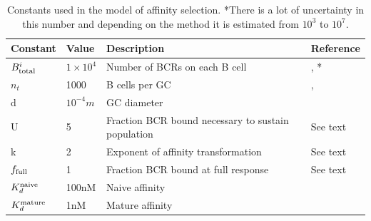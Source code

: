 

\begin{table}[ht]
\centering
\begin{tabular}{llll}
Constant    & Value & Description & Reference \\ \hline
$B^i_{\text{total}}$ & $1\times10^{4}$     & Number of BCRs on each B cell & \cite{immprot}, \cite{rieckmann2017social}*     \\
$n_t$ & 1000 & B cells per GC &  \cite{kroese1990germinal}, \cite{Childs_Baskerville_Cobey_2015} \\
d & $10^{-4} m$ & GC diameter &  \cite{Romppanen_1981} \\
U           & 5     & Fraction BCR bound necessary to sustain population & See text \\
k           & 2     & Exponent of affinity transformation & See text  \\
$f_{\text{full}}$  & 1     & Fraction BCR bound at full response & See text \\
$K_d^{\text{naive}}$ & 100nM & Naive affinity & \cite{berek1987mutation} \\
$K_d^{\text{mature}}$ & 1nM & Mature affinity & \cite{berek1987mutation} \\
\end{tabular}
\caption{
\label{constants}
    Constants used in the model of affinity selection. *There is a lot of uncertainty in this number and depending on the method it is estimated from $10^3$ to $10^7$.}
\end{table}









